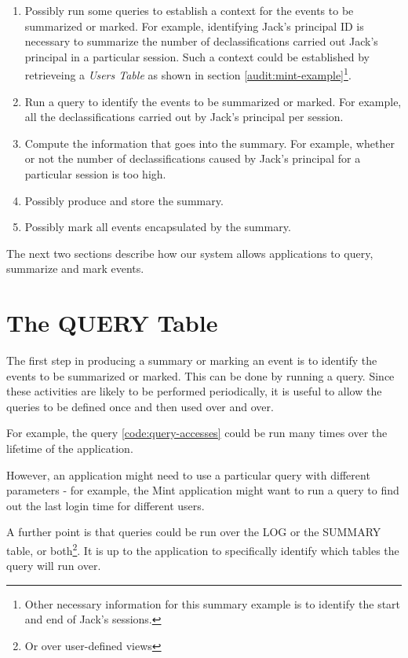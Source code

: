 \begin{enumerate}
  \item Possibly run some queries to establish a context for the events to be summarized or marked. For example, identifying Jack's principal ID is necessary to summarize the number of declassifications carried out Jack's principal in a particular session. Such a context could be established by retrieveing a \emph{Users Table} as shown in section \ref{audit:mint-example}\footnote{Other necessary information for this summary example is to identify the start and end of Jack's sessions.}.
  \item Run a query to identify the events to be summarized or marked. For example, all the declassifications carried out by Jack's principal per session.
  \item Compute the information that goes into the summary. For example, whether or not the number of declassifications caused by Jack's principal for a particular session is too high.
  \item Possibly produce and store the summary.
  \item Possibly mark all events encapsulated by the summary.
\end{enumerate}

\noindent
The next two sections describe how our system allows applications to query, summarize and mark events.

\section{The QUERY Table}

The first step in producing a summary or marking an event is to identify the events to be summarized or marked. This can be done by running a query. Since these activities are likely to be performed periodically, it is useful to allow the queries to be defined once and then used over and over.

For example, the query \ref{code:query-accesses} could be run many times over the lifetime of the application.

However, an application might need to use a particular query with different parameters - for example, the Mint application might want to run a query to find out the last login time for different users.

A further point is that queries could be run over the LOG or the SUMMARY table, or both\footnote{Or over user-defined views}. It is up to the application to specifically identify which tables the query will run over.

